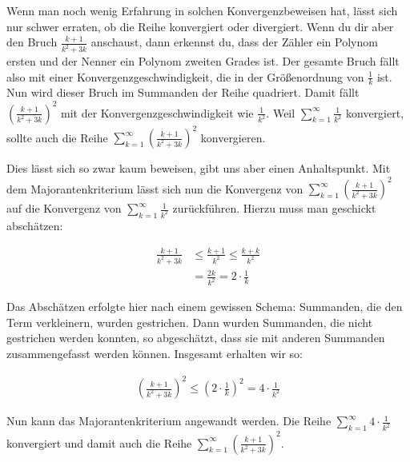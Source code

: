 \documentclass[fontsize=9pt,
               parskip=half-,
               DIV=14,
               listof=chapterentry,
               tocflat]{scrbook}
\begin{document}
\begin{solutionprocess*}[Majorantenkriterium]
Wenn man noch wenig Erfahrung in solchen Konvergenzbeweisen hat, lässt sich nur schwer erraten, ob die Reihe konvergiert oder divergiert. Wenn du dir aber den Bruch ${\tfrac {k+1}{k^{2}+3k}}$ anschaust, dann erkennst du, dass der Zähler ein Polynom ersten und der Nenner ein Polynom zweiten Grades ist. Der gesamte Bruch fällt also mit einer Konvergenzgeschwindigkeit, die in der Größenordnung von ${\tfrac {1}{k}}$ ist. Nun wird dieser Bruch im Summanden der Reihe quadriert. Damit fällt $\left({\tfrac {k+1}{k^{2}+3k}}\right)^{2}$ mit der Konvergenzgeschwindigkeit wie ${\tfrac {1}{k^{2}}}$. Weil $\sum _{k=1}^{\infty }{\frac {1}{k^{2}}}$ konvergiert, sollte auch die Reihe $\sum _{k=1}^{\infty }\left({\frac {k+1}{k^{2}+3k}}\right)^{2}$ konvergieren.

Dies lässt sich so zwar kaum beweisen, gibt uns aber einen Anhaltspunkt. Mit dem Majorantenkriterium lässt sich nun die Konvergenz von $\sum _{k=1}^{\infty }\left({\frac {k+1}{k^{2}+3k}}\right)^{2}$ auf die Konvergenz von $\sum _{k=1}^{\infty }{\frac {1}{k^{2}}}$ zurückführen. Hierzu muss man geschickt abschätzen:

\begin{align*}
{\frac {k+1}{k^{2}+3k}}&\leq {\frac {k+1}{k^{2}}}\leq {\frac {k+k}{k^{2}}}\\[0.5em]&={\frac {2k}{k^{2}}}=2\cdot {\frac {1}{k}}
\end{align*}

Das Abschätzen erfolgte hier nach einem gewissen Schema: Summanden, die den Term verkleinern, wurden gestrichen. Dann wurden Summanden, die nicht gestrichen werden konnten, so abgeschätzt, dass sie mit anderen Summanden zusammengefasst werden können. Insgesamt erhalten wir so:

\begin{align*}
\left({\frac {k+1}{k^{2}+3k}}\right)^{2}\leq \left(2\cdot {\frac {1}{k}}\right)^{2}=4\cdot {\frac {1}{k^{2}}}
\end{align*}

Nun kann das Majorantenkriterium angewandt werden. Die Reihe $\sum _{k=1}^{\infty }4\cdot {\frac {1}{k^{2}}}$ konvergiert und damit auch die Reihe $\sum _{k=1}^{\infty }\left({\frac {k+1}{k^{2}+3k}}\right)^{2}$.

\end{solutionprocess*}
\end{document}
